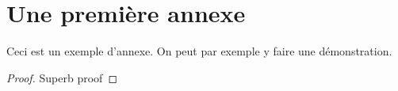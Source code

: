 %
%
%


\chapter{Une première annexe}

Ceci est un exemple d'annexe. On peut par exemple y faire une démonstration.
\begin{proof}
    Superb proof
\end{proof}